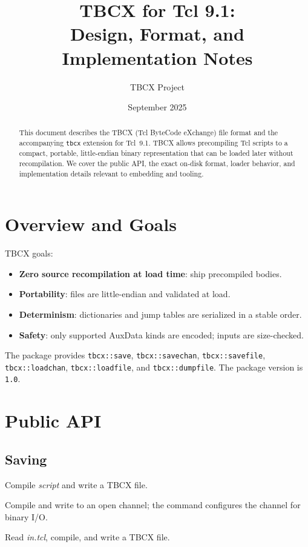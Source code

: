 \documentclass[11pt,a4paper]{article}
\title{\LARGE TBCX for Tcl 9.1:\\ Design, Format, and Implementation Notes}
\author{TBCX Project}
\date{September 2025}
\begin{document}
\maketitle

\begin{abstract}
This document describes the TBCX (Tcl ByteCode eXchange) file format and the
accompanying \texttt{tbcx} extension for Tcl~9.1. TBCX allows precompiling Tcl
scripts to a compact, portable, little-endian binary representation that can be
loaded later without recompilation. We cover the public API, the exact on-disk
format, loader behavior, and implementation details relevant to embedding and tooling.
\end{abstract}

\section{Overview and Goals}
TBCX goals:
\begin{itemize}[nosep]
  \item \textbf{Zero source recompilation at load time}: ship precompiled bodies.
  \item \textbf{Portability}: files are little-endian and validated at load.
  \item \textbf{Determinism}: dictionaries and jump tables are serialized in a stable order.
  \item \textbf{Safety}: only supported AuxData kinds are encoded; inputs are size-checked.
\end{itemize}

The package provides \texttt{tbcx::save}, \texttt{tbcx::savechan}, \texttt{tbcx::savefile},
\texttt{tbcx::loadchan}, \texttt{tbcx::loadfile}, and \texttt{tbcx::dumpfile}. The package
version is \texttt{1.0}.

\section{Public API}
\subsection{Saving}
\begin{description}[style=nextline]
  \item[\texttt{tbcx::save \emph{script} \emph{outPath}}] Compile \emph{script} and write a TBCX file.
  \item[\texttt{tbcx::savechan \emph{script} \emph{channelName}}] Compile and write to an open channel; the command configures the channel for binary I/O.
  \item[\texttt{tbcx::savefile \emph{in.tcl} \emph{outPath}}] Read \emph{in.tcl}, compile, and write a TBCX file.
\end{description}
\end{document}
